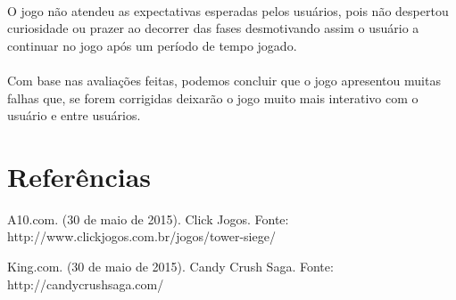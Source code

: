 \documentclass[12pt]{article}
\begin{document}
\paragraph{} O jogo não atendeu as expectativas esperadas pelos usuários, pois não despertou curiosidade ou prazer ao decorrer das fases desmotivando assim o usuário a continuar no jogo após um período de tempo jogado.  \\
    
\paragraph{} Com base nas avaliações feitas, podemos concluir que o jogo apresentou muitas falhas que, se forem corrigidas deixarão o jogo muito mais interativo com o usuário e entre usuários.

\section{Referências}

A10.com. (30 de maio de 2015). Click Jogos. Fonte: http://www.clickjogos.com.br/jogos/tower-siege/

King.com. (30 de maio de 2015). Candy Crush Saga. Fonte: http://candycrushsaga.com/
\end{document}
